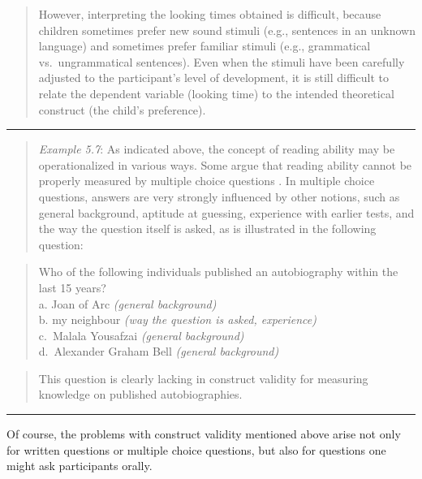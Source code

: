 \documentclass[
]{book}
\begin{document}
\begin{quote}
However, interpreting the looking times obtained is difficult, because children sometimes prefer new sound stimuli (e.g., sentences in an unknown language) and sometimes prefer familiar stimuli (e.g., grammatical vs.~ungrammatical sentences). Even when the stimuli have been carefully adjusted to the participant's level of development, it is still difficult to relate the dependent variable (looking time) to the intended theoretical construct (the child's preference).
\end{quote}

\begin{center}\rule{0.5\linewidth}{0.5pt}\end{center}

\begin{quote}
\emph{Example 5.7}: As indicated above, the concept of reading ability may be operationalized in various ways. Some argue that reading ability cannot be properly measured by multiple choice questions \citep{Shoh84, Hout86}. In multiple choice questions, answers are very strongly influenced by other notions, such as general background, aptitude at guessing, experience with earlier tests, and the way the question itself is asked, as is illustrated in the following question:
\end{quote}

\begin{quote}
Who of the following individuals published an autobiography within the last 15 years?\\
a. Joan of Arc \emph{(general background)}\\
b. my neighbour \emph{(way the question is asked, experience)}\\
c.~Malala Yousafzai \emph{(general background)}\\
d.~Alexander Graham Bell \emph{(general background)}\\
\end{quote}

\begin{quote}
This question is clearly lacking in construct validity for measuring knowledge on published autobiographies.
\end{quote}

\begin{center}\rule{0.5\linewidth}{0.5pt}\end{center}

Of course, the problems with construct validity mentioned above arise not only for written questions or multiple choice questions, but also for questions one might ask participants orally.
\end{document}

